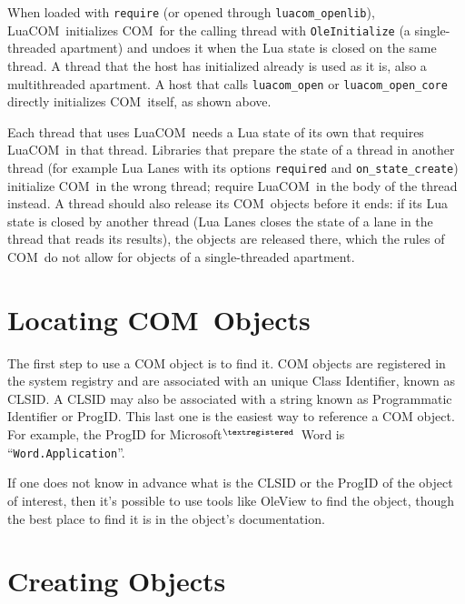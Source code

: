 \documentclass[11pt,a4paper,english]{report}
\newcommand{\ident}[1]{\mbox{\texttt{#1}}}
\newcommand{\techname}[1]{\mbox{#1}}
\newcommand{\com}{\techname{COM}}
\newcommand{\luacom}{\techname{LuaCOM}}
\newcommand{\registered}{$^{\textregistered}$}
\begin{document}
When loaded with \verb+require+ (or opened through
\verb+luacom_openlib+), \luacom\ initializes \com\ for the calling
thread with \ident{OleInitialize} (a single-threaded apartment) and
undoes it when the Lua state is closed on the same thread. A thread
that the host has initialized already is used as it is, also a
multithreaded apartment. A host that calls \verb+luacom_open+ or
\verb+luacom_open_core+ directly initializes \com\ itself, as shown
above.

Each thread that uses \luacom\ needs a Lua state of its own that
requires \luacom\ in that thread. Libraries that prepare the state of
a thread in another thread (for example Lua Lanes with its options
\verb+required+ and \verb+on_state_create+) initialize \com\ in the
wrong thread; require \luacom\ in the body of the thread instead. A
thread should also release its \com\ objects before it ends: if its
Lua state is closed by another thread (Lua Lanes closes the state of a
lane in the thread that reads its results), the objects are released
there, which the rules of \com\ do not allow for objects of a
single-threaded apartment.


\section{Locating \com\ Objects}

The first step to use a COM object is to find it. COM objects are
registered in the system registry and are associated with an unique
Class Identifier, known as CLSID. A CLSID may also be associated with
a string known as Programmatic Identifier or ProgID. This last one is
the easiest way to reference a COM object. For example, the ProgID for
Microsoft\registered\ Word is ``\ident{Word.Application}''.

If one does not know in advance what is the CLSID or the ProgID of the
object of interest, then it's possible to use tools like OleView to
find the object, though the best place to find it is in the object's
documentation.


\section{Creating Objects}
\end{document}

